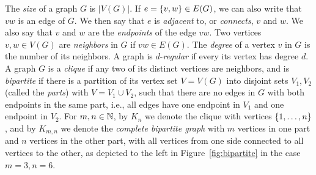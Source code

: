 The \emph{size} of a graph $G$ is $|V(G)|$.
If $e=\{v,w\}\in E(G)$, we can also write that $vw$ is an edge of $G$. We then say that $e$ is \emph{adjacent} to, or \emph{connects}, $v$ and $w$.
We also say  that $v$ and $w$ are the \emph{endpoints} of the edge $vw$.
Two vertices $v,w\in V(G)$ are \emph{neighbors} in $G$
if $vw\in E(G)$. The \emph{degree} of a vertex $v$ in $G$
is the number of its neighbors. A graph is $d$-\emph{regular} if every its vertex has degree $d$.
A graph $G$ is a \emph{clique} if any two of its distinct vertices are neighbors, and is \emph{bipartite} if there is a partition 
of its vertex set $V=V(G)$ into disjoint sets $V_1,V_2$
(called the \emph{parts}) with $V=V_1\cup V_2$, such that there are no edges in $G$ with both endpoints in the same part, i.e., all edges have one endpoint in $V_1$ and one endpoint in $V_2$. For $m,n\in\mathbb{N}$, by
 $K_n$ we denote the clique with vertices $\{1,\ldots,n\}$, and by $K_{m,n}$ we denote the \emph{complete bipartite graph} with $m$
 vertices in one part and $n$ vertices in the other part, with all vertices from one side connected to all vertices to the other,
 as depicted to the left in Figure~\ref{fig:bipartite} in the case $m=3,n=6$.

